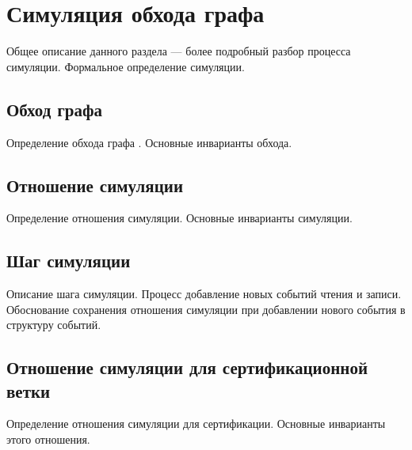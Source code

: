 \pagebreak

\section{Симуляция обхода графа \IMM}

Общее описание данного раздела --- более подробный разбор процесса симуляции.
Формальное определение симуляции.

\subsection{Обход графа \IMM}

Определение обхода графа \IMM. Основные инварианты обхода.

\subsection{Отношение симуляции}

Определение отношения симуляции. Основные инварианты симуляции.

\subsection{Шаг симуляции}

Описание шага симуляции. Процесс добавление новых событий чтения и записи.
Обоснование сохранения отношения симуляции при добавлении
нового события в структуру событий.

\subsection{Отношение симуляции для сертификационной ветки}

Определение отношения симуляции для сертификации. Основные инварианты этого отношения.

